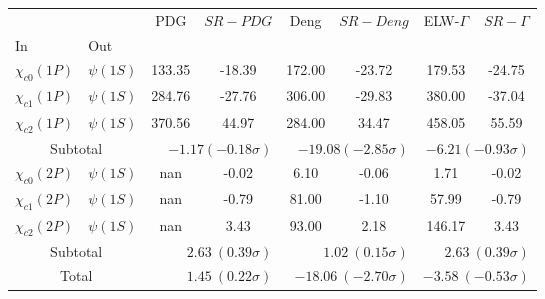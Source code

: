 \begin{tabular}{|l|l|c|c|c|c|c|c|}%
\hline%
&&PDG&$SR-PDG$&Deng&$SR-Deng$&ELW-$\Gamma$&$SR-\Gamma$\\%
In&Out&&&&&&\\%
\hline%
$\chi_{c0}(1P)$&$\psi(1S)$&133.35&-18.39&172.00&-23.72&179.53&-24.75\\%
$\chi_{c1}(1P)$&$\psi(1S)$&284.76&-27.76&306.00&-29.83&380.00&-37.04\\%
$\chi_{c2}(1P)$&$\psi(1S)$&370.56&44.97&284.00&34.47&458.05&55.59\\%
\hline%
\hline%
\multicolumn{2}{|c|}{Subtotal}&\multicolumn{2}{|r|}{$-1.17 (-0.18\sigma)$}&\multicolumn{2}{|r|}{$-19.08 (-2.85\sigma)$}&\multicolumn{2}{|r|}{$-6.21 (-0.93\sigma)$}\\%
\hline%
\hline%
$\chi_{c0}(2P)$&$\psi(1S)$&nan&-0.02&6.10&-0.06&1.71&-0.02\\%
$\chi_{c1}(2P)$&$\psi(1S)$&nan&-0.79&81.00&-1.10&57.99&-0.79\\%
$\chi_{c2}(2P)$&$\psi(1S)$&nan&3.43&93.00&2.18&146.17&3.43\\%
\hline%
\hline%
\multicolumn{2}{|c|}{Subtotal}&\multicolumn{2}{|r|}{$2.63~(0.39\sigma)$}&\multicolumn{2}{|r|}{$1.02~(0.15\sigma)$}&\multicolumn{2}{|r|}{$2.63~(0.39\sigma)$}\\%
\hline%
\hline%
\multicolumn{2}{|c|}{Total}&\multicolumn{2}{|r|}{$1.45~(0.22\sigma)$}&\multicolumn{2}{|r|}{$-18.06~(-2.70\sigma)$}&\multicolumn{2}{|r|}{$-3.58~(-0.53\sigma)$}\\%
\hline%
\end{tabular}